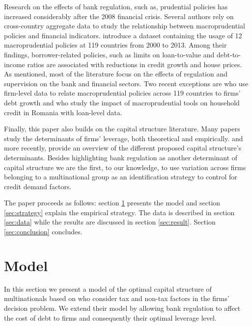 \documentclass[12pt]{article}
\begin{document}
	Research on the effects of bank regulation, such as, prudential policies has increased considerably after the 2008 financial crisis. Several authors rely on cross-country aggregate data to study the relationship between macroprudential policies and financial indicators. \cite*{cerutti2017use} introduce a dataset containing the usage of 12 macroprudential policies at 119 countries from 2000 to 2013. Among their findings, borrower-related policies, such as limits on loan-to-value and debt-to-income ratios are associated with reductions in credit growth and house prices. As mentioned, most of the literature focus on the effects of regulation and supervision on the bank and financial sectors. Two recent exceptions are \cite*{ayyagari2017credit} who use firm-level data to relate macroprudential policies across 119 countries to firms' debt growth and \cite*{epure2017household} who study the impact of macroprudential tools on household credit in Romania with loan-level data.    
	
	Finally, this paper also builds on the capital structure literature. Many papers study the determinants of firms' leverage, both theoretical and empirically. \cite*{titman1988determinants} and more recently, \cite*{oztekin2015capital} provide an overview of the different proposed capital structure's determinants. Besides highlighting bank regulation as another determinant of capital structure we are the first, to our knowledge, to use variation across firms belonging to a multinational group as an identification strategy to control for credit demand factors.          
	
	The paper proceeds as follows: section \ref{sec:model} presents the model and section \ref{sec:strategy} explain the empirical strategy. The data is described in section \ref{sec:data} while the results are discussed in section \ref{sec:result}. Section \ref{sec:conclusion} concludes. 
	
		\section{Model} \label{sec:model}
	In this section we present a model of the optimal capital structure of multinationals based on \cite{huizinga2008capital} who consider tax and non-tax factors in the firms' decision problem. We extend their model by allowing bank regulation to affect the cost of debt to firms and consequently their optimal leverage level.  
	
\end{document}
